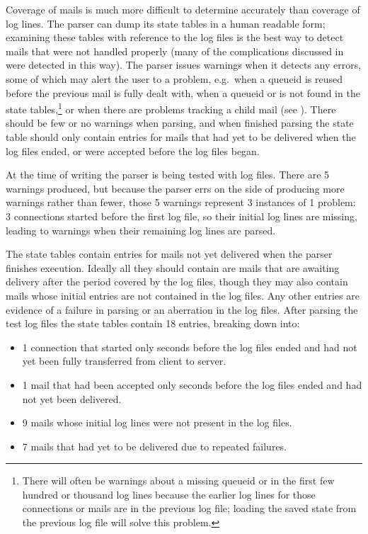 \label{mails-covered}

Coverage of mails is much more difficult to determine accurately than
coverage of log lines.  The parser can dump its state tables in a human
readable form; examining these tables with reference to the log files is
the best way to detect mails that were not handled properly (many of the
complications discussed in  were detected in this
way).  The parser issues warnings when it detects any errors, some of which
may alert the user to a problem, e.g.\ when a queueid is reused before the
previous mail is fully dealt with, when a queueid or  is not
found in the state tables,\footnote{There will often be warnings about a
missing queueid or  in the first few hundred or thousand log
lines because the earlier log lines for those connections or mails are in
the previous log file; loading the saved state from the previous log file
will solve this problem.} or when there are problems tracking a child mail
(see ).  There should be few or no
warnings when parsing, and when finished parsing the state table should
only contain entries for mails that had yet to be delivered when the log
files ended, or were accepted before the log files began.

At the time of writing the parser is being tested with \numberOFlogFILES{}
log files.  There are 5 warnings produced, but because the parser errs on
the side of producing more warnings rather than fewer, those 5 warnings
represent 3 instances of 1 problem: 3 connections started before the first
log file, so their initial log lines are missing, leading to warnings when
their remaining log lines are parsed.

The state tables contain entries for mails not yet delivered when the
parser finishes execution.  Ideally all they should contain are mails that
are awaiting delivery after the period covered by the log files, though
they may also contain mails whose initial entries are not contained in the
log files.  Any other entries are evidence of a failure in parsing or an
aberration in the log files.  After parsing the \numberOFlogFILES{} test
log files the state tables contain 18 entries, breaking down into:

\begin{itemize}

    \item 1 connection that started only seconds before the log files
        ended and had not yet been fully transferred from client to server.

    \item 1 mail that had been accepted only seconds before the log files
        ended and had not yet been delivered.

    \item 9 mails whose initial log lines were not present in the log
        files.

    \item 7 mails that had yet to be delivered due to repeated failures.

\end{itemize}

